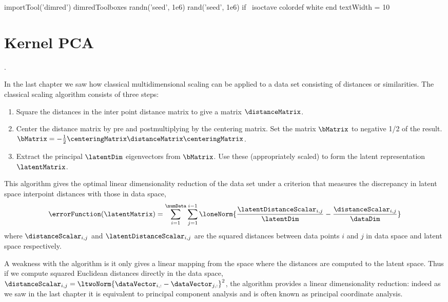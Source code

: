 \begin{matlab}
  importTool('dimred')
  dimredToolboxes
  randn('seed', 1e6)
  rand('seed', 1e6)
  if ~isoctave
  colordef white
  end
  textWidth = 10
\end{matlab}

\chapter{Kernel PCA}
.

In the last chapter we saw how classical multidimensional scaling can
be applied to a data set consisting of distances or similarities. The
classical scaling algorithm consists of three steps:
\begin{enumerate}
\item Square the distances in the inter point distance matrix to give
  a matrix $\distanceMatrix$.
\item Center the distance matrix by pre and postmultiplying by the
  centering matrix. Set the matrix $\bMatrix$ to negative 1/2 of the
  result. $\bMatrix = -\frac{1}{2}\centeringMatrix \distanceMatrix
  \centeringMatrix $.
\item Extract the principal $\latentDim$ eigenvectors from
  $\bMatrix$. Use these (appropriately scaled) to form the latent
  representation $\latentMatrix$.
\end{enumerate}
This algorithm gives the optimal linear dimensionality reduction of
the data set under a criterion that measures the discrepancy in latent
space interpoint distances with those in data space,
\[
\errorFunction(\latentMatrix) = \sum_{i=1}^\numData \sum_{j=1}^{i-1} \loneNorm{\frac{\latentDistanceScalar_{i,j}}{\latentDim} -\frac{\distanceScalar_{i,j}}{\dataDim}}
\]
where $\distanceScalar_{i,j}$ and $\latentDistanceScalar_{i,j}$ are
the squared distances between data points $i$ and $j$ in data space
and latent space respectively.

A weakness with the algorithm is it only gives a linear mapping from
the space where the distances are computed to the latent space. Thus
if we compute squared Euclidean distances directly in the data space,
$\distanceScalar_{i,j} = \ltwoNorm{\dataVector_{i,:}-\dataVector_{j,
    :}}^2$, the algorithm provides a linear dimensionality reduction:
indeed as we saw in the last chapter it is equivalent to principal
component analysis and is often known as principal coordinate
analysis.

